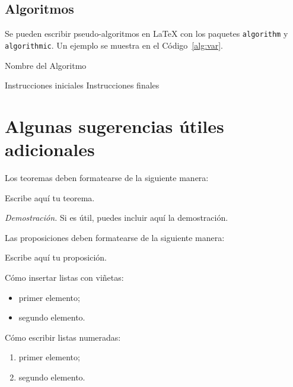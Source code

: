 \documentclass[11pt,a4paper]{article}
\begin{document}
\subsection{Algoritmos}
\label{subsec:algorithms}

Se pueden escribir pseudo-algoritmos en \LaTeX{} con los paquetes \texttt{algorithm} y \texttt{algorithmic}. Un ejemplo se muestra en el Código~\ref{alg:var}.

\begin{algorithm}[H]
\caption{Nombre del Algoritmo}
\label{alg:var}
\label{protocol1}
\begin{algorithmic}[1]
\STATE Instrucciones iniciales
\ENDIF
\ENDFOR
{}
\ENDWHILE
\STATE Instrucciones finales
\end{algorithmic}
\end{algorithm} 


\section{Algunas sugerencias útiles adicionales}

Los teoremas deben formatearse de la siguiente manera:
\begin{theorem}
\label{a_theorem}
Escribe aquí tu teorema.
\end{theorem}
\textit{Demostración.} Si es útil, puedes incluir aquí la demostración.
\vspace{0.3cm} %

Las proposiciones deben formatearse de la siguiente manera:
\begin{proposition}
Escribe aquí tu proposición.
\end{proposition}
\vspace{0.3cm} %

Cómo insertar listas con viñetas:
\begin{itemize}
    \item primer elemento;
    \item segundo elemento.
\end{itemize}
Cómo escribir listas numeradas:
\begin{enumerate}
    \item primer elemento;
    \item segundo elemento.
\end{enumerate}
\end{document}
